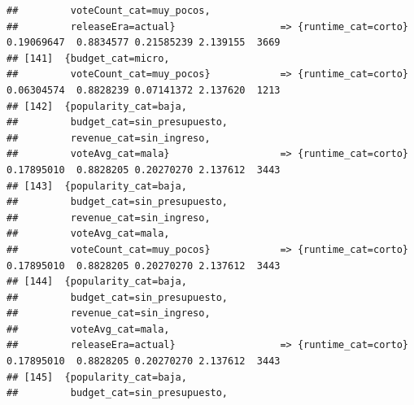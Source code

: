 \documentclass[
]{article}
\begin{document}
\begin{verbatim}
##         voteCount_cat=muy_pocos,                                                                                                
##         releaseEra=actual}                  => {runtime_cat=corto}               0.19069647  0.8834577 0.21585239 2.139155  3669
## [141]  {budget_cat=micro,                                                                                                       
##         voteCount_cat=muy_pocos}            => {runtime_cat=corto}               0.06304574  0.8828239 0.07141372 2.137620  1213
## [142]  {popularity_cat=baja,                                                                                                    
##         budget_cat=sin_presupuesto,                                                                                             
##         revenue_cat=sin_ingreso,                                                                                                
##         voteAvg_cat=mala}                   => {runtime_cat=corto}               0.17895010  0.8828205 0.20270270 2.137612  3443
## [143]  {popularity_cat=baja,                                                                                                    
##         budget_cat=sin_presupuesto,                                                                                             
##         revenue_cat=sin_ingreso,                                                                                                
##         voteAvg_cat=mala,                                                                                                       
##         voteCount_cat=muy_pocos}            => {runtime_cat=corto}               0.17895010  0.8828205 0.20270270 2.137612  3443
## [144]  {popularity_cat=baja,                                                                                                    
##         budget_cat=sin_presupuesto,                                                                                             
##         revenue_cat=sin_ingreso,                                                                                                
##         voteAvg_cat=mala,                                                                                                       
##         releaseEra=actual}                  => {runtime_cat=corto}               0.17895010  0.8828205 0.20270270 2.137612  3443
## [145]  {popularity_cat=baja,                                                                                                    
##         budget_cat=sin_presupuesto,                                                                                             

\end{verbatim}
\end{document}
